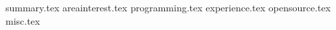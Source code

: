 \documentclass[11pt, a4paper]{awesome-cv}
\newcommand*{\sectiondir}{resume/}
\begin{document}
\makecvheader

{summary.tex}
{areainterest.tex}
{programming.tex}
{experience.tex}
{opensource.tex}
{misc.tex}
\end{document}
